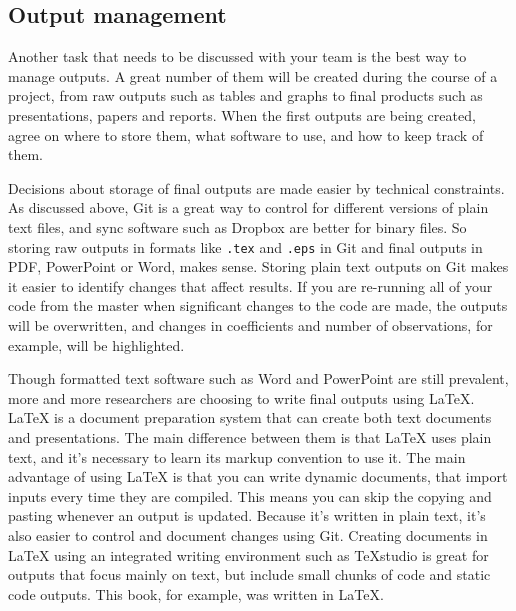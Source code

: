 \subsection{Output management}

Another task that needs to be discussed with your team is the best way to manage outputs.
A great number of them will be created during the course of a project,
from raw outputs such as tables and graphs to final products such as presentations, papers and reports.
When the first outputs are being created, agree on where to store them,
what software to use, and how to keep track of them.

Decisions about storage of final outputs are made easier by technical constraints.
As discussed above, Git is a great way to control for different versions of
plain text files, and sync software such as Dropbox are better for binary files.
So storing raw outputs in formats like \texttt{.tex} and \texttt{.eps} in Git and
final outputs in PDF, PowerPoint or Word, makes sense.
Storing plain text outputs on Git makes it easier to identify changes that affect results.
If you are re-running all of your code from the master when significant changes to the code are made,
the outputs will be overwritten, and changes in coefficients and number of observations, for example,
will be highlighted.

Though formatted text software such as Word and PowerPoint are still prevalent,
more and more researchers are choosing to write final outputs using
\LaTeX.
{\LaTeX} is a document preparation system that can create both text documents and presentations.
The main difference between them is that {\LaTeX} uses plain text,
and it's necessary to learn its markup convention to use it.
The main advantage of using {\LaTeX} is that you can write dynamic documents,
that import inputs every time they are compiled.
This means you can skip the copying and pasting whenever an output is updated.
Because it's written in plain text, it's also easier to control and document changes using Git.
Creating documents in {\LaTeX} using an integrated writing environment such as TeXstudio
is great for outputs that focus mainly on text,
but include small chunks of code and static code outputs.
This book, for example, was written in \LaTeX.

